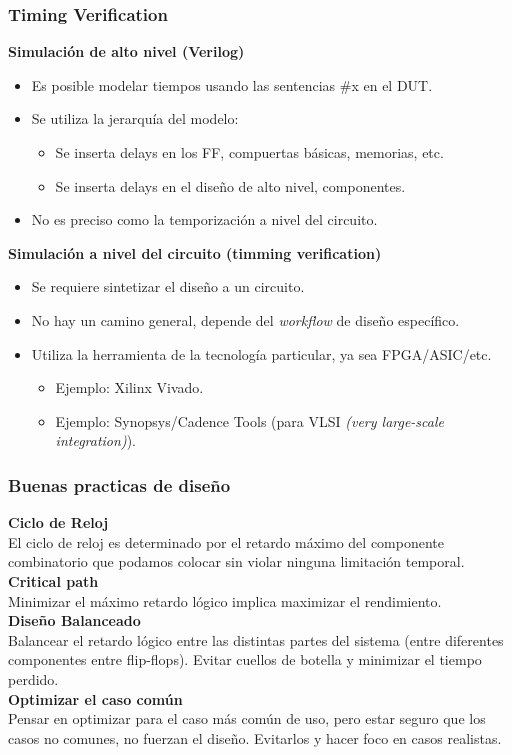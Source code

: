 \documentclass[aspectratio=169]{beamer}
\begin{document}
\begin{frame}[fragile,t]
    \frametitle{Timing Verification}
    \textcolor{naranjauca}{\textbf{Simulación de alto nivel (Verilog)}}
    \begin{itemize}
    \item<2-> Es posible modelar tiempos usando las sentencias \#x en el DUT.
    \item<3-> Se utiliza la jerarquía del modelo:
    \begin{itemize}
    \item Se inserta delays en los FF, compuertas básicas, memorias, etc.
    \item Se inserta delays en el diseño de alto nivel, componentes.
    \end{itemize}
    \item<4-> No es preciso como la temporización a nivel del circuito.
    \end{itemize}
    \bigskip
    \textcolor{naranjauca}{\textbf{Simulación a nivel del circuito (timming verification)}}
    \begin{itemize}
    \item<5-> Se requiere sintetizar el diseño a un circuito.
    \item<6-> No hay un camino general, depende del \emph{workflow} de diseño específico.
    \item<7-> Utiliza la herramienta de la tecnología particular, ya sea FPGA/ASIC/etc.
    \begin{itemize}
    \item Ejemplo: Xilinx Vivado.
    \item Ejemplo: Synopsys/Cadence Tools (para VLSI \emph{(very large-scale integration)}).
    \end{itemize}
    \end{itemize}
\end{frame}

\begin{frame}[fragile]
    \frametitle{Buenas practicas de diseño}
    \textbf{Ciclo de Reloj}\\
    El ciclo de reloj es determinado por el retardo máximo del componente combinatorio que podamos colocar sin violar ninguna limitación temporal.\\
    \bigskip
    \pause
    \textbf{Critical path}\\
    Minimizar el máximo retardo lógico implica maximizar el rendimiento.\\
    \bigskip
    \pause
    \textbf{Diseño Balanceado}\\
    Balancear el retardo lógico entre las distintas partes del sistema (entre diferentes componentes entre flip-flops).
    Evitar cuellos de botella y minimizar el tiempo perdido.\\
    \bigskip
    \pause
    \textbf{Optimizar el caso común}\\
    Pensar en optimizar para el caso más común de uso, pero estar seguro que los casos no comunes, no fuerzan el diseño. Evitarlos y hacer foco en casos realistas.\\
\end{frame}
\end{document}
